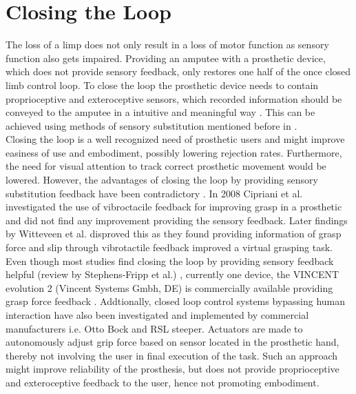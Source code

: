 \section{Closing the Loop}

The loss of a limp does not only result in a loss of motor function as sensory function also gets impaired. Providing an amputee with a prosthetic device, which does not provide sensory feedback, only restores one half of the once closed limb control loop. To close the loop the prosthetic device needs to contain proprioceptive and exteroceptive sensors, which recorded information should be conveyed to the amputee in a intuitive and meaningful way \cite{Markovic2018}. This can be achieved using methods of sensory substitution mentioned before in . \\
Closing the loop is a well recognized need of prosthetic users and might improve easiness of use and embodiment, possibly lowering rejection rates. Furthermore, the need for visual attention to track correct prosthetic movement would be lowered. \cite{Strbac2016} However, the advantages of closing the loop by providing sensory substitution feedback have been contradictory \cite{Jorgovanovic2014}. In 2008 Cipriani et al. \cite{Cipriani2008} investigated the use of vibroctacile feedback for improving grasp in a prosthetic and did not find any improvement providing the sensory feedback. Later findings by Witteveen et al. \cite{Witteveen2012} disproved this as they found providing information of grasp force and slip through vibrotactile feedback improved a virtual grasping task. \\
Even though most studies find closing the loop by providing sensory feedback helpful (review by Stephens-Fripp et al.) \cite{Stephens-Fripp2018}, currently one device, the VINCENT evolution 2 (Vincent Systems Gmbh, DE) is commercially available providing grasp force feedback \cite{Systems2005}.  
Addtionally, closed loop control systems bypassing human interaction have also been investigated and implemented by commercial manufacturers i.e. Otto Bock and RSL steeper. Actuators are made to autonomously adjust grip force based on sensor located in the prosthetic hand, thereby not involving the user in final execution of the task. \cite{Xu2016} Such an approach might improve reliability of the prosthesis, but does not provide proprioceptive and exteroceptive feedback to the user, hence not promoting embodiment.  




